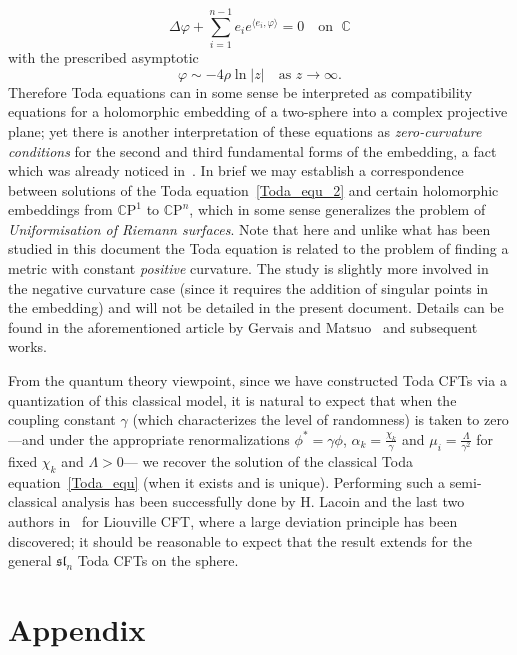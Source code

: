 \documentclass[AHL,Unicode,longabstracts,published]{cedram}
\newcommand{\frksl}{\mathfrak{sl}}
\newcommand{\rmP}{\mathrm{P}}
\newcommand{\C}{\mathbb{C}}
\newcommand{\ps}[1]{\langle #1 \rangle}
\newcommand{\norm}[1]{\left\lvert#1\right\rvert}
\begin{document}
\begin{equation}\label{Toda_equ_2}
\Delta\varphi+\sum_{i=1}^{n-1}e_ie^{\ps{e_i,\varphi}}=0 \quad\text{on }\;\C
\end{equation}
with the prescribed asymptotic
\begin{equation}
\varphi\sim-4\rho\ln\norm{z}\quad\text{as }z\to\infty.
\end{equation}
Therefore Toda equations can in some sense be interpreted as compatibility equations for a holomorphic embedding of a two-sphere into a complex projective plane; yet there is another interpretation of these equations as \emph{zero-curvature conditions} for the second and third fundamental forms of the embedding, a fact which was already noticed in~\cite{LS79}. In brief we may establish a correspondence between solutions of the Toda equation~\eqref{Toda_equ_2} and certain holomorphic embeddings from $\C\rmP^1$ to $\C\rmP^n$, which in some sense generalizes the problem of \emph{Uniformisation of Riemann surfaces}. Note that here and unlike what has been studied in this document the Toda equation is related to the problem of finding a metric with constant \emph{positive} curvature. The study is slightly more involved in the negative curvature case (since it requires the addition of singular points in the embedding) and will not be detailed in the present document. Details can be found in the aforementioned article by Gervais and Matsuo~\cite{GeMa92} and subsequent works.

From the quantum theory viewpoint, since we have constructed Toda CFTs via a quantization of this classical model, it is natural to expect that when the coupling constant $\gamma$ (which characterizes the level of randomness) is taken to zero ---and under the appropriate renormalizations $\phi^*=\gamma\phi$, $\alpha_k=\frac{\chi_k}{\gamma}$ and $\mu_i=\frac{\Lambda}{\gamma^2}$ for fixed $\chi_k$ and $\Lambda>0$--- we recover the solution of the classical Toda equation~\eqref{Toda_equ} (when it exists and is unique). Performing such a semi-classical analysis has been successfully done by H. Lacoin and the last two authors in~\cite{LRV19} for Liouville CFT, where a large deviation principle has been discovered; it should be reasonable to expect that the result extends for the general $\frksl_n$ Toda CFTs on the sphere.



\section{Appendix}
\end{document}
